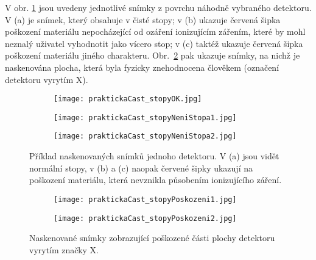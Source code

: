 V obr. \ref{fig:praktickaCast_stopy} jsou uvedeny jednotlivé snímky z povrchu náhodně vybraného detektoru. V (a) je snímek, který obsahuje v čisté stopy; v (b) ukazuje červená šipka poškození materiálu nepocházející od ozáření ionizujícím zářením, které by mohl neznalý uživatel vyhodnotit jako vícero stop; v (c) taktéž ukazuje červená šipka poškození materiálu jiného charakteru. Obr.~\ref{fig:praktickaCast_stopyPoskozeni} pak ukazuje snímky, na nichž je naskenována plocha, která byla fyzicky znehodnocena člověkem (označení detektoru vyrytím X). 
\begin{figure}[h]
  \centering
  \begin{subfigure}{0.7\textwidth}
	\texttt{[image: praktickaCast\_stopyOK.jpg]}
	\caption{}
  \end{subfigure}
  \begin{subfigure}{0.7\textwidth}
	\texttt{[image: praktickaCast\_stopyNeniStopa1.jpg]}
	\caption{}
  \end{subfigure}
  \begin{subfigure}{0.7\textwidth}
	\texttt{[image: praktickaCast\_stopyNeniStopa2.jpg]}
	\caption{}
  \end{subfigure}
  \caption{Příklad naskenovaných snímků jednoho detektoru. V (a) jsou vidět normální stopy, v (b) a (c) naopak červené šipky ukazují na poškození materiálu, která nevznikla působením ionizujícího záření.}
  \label{fig:praktickaCast_stopy}
\end{figure}
\begin{figure}[h]
  \centering
  \begin{subfigure}{0.7\textwidth}
	\texttt{[image: praktickaCast\_stopyPoskozeni1.jpg]}
	\caption{}
  \end{subfigure}
  \begin{subfigure}{0.7\textwidth}
	\texttt{[image: praktickaCast\_stopyPoskozeni2.jpg]}
	\caption{}
  \end{subfigure}
  \caption{Naskenované snímky zobrazující poškozené části plochy detektoru vyrytím značky X.}
  \label{fig:praktickaCast_stopyPoskozeni}
\end{figure}

